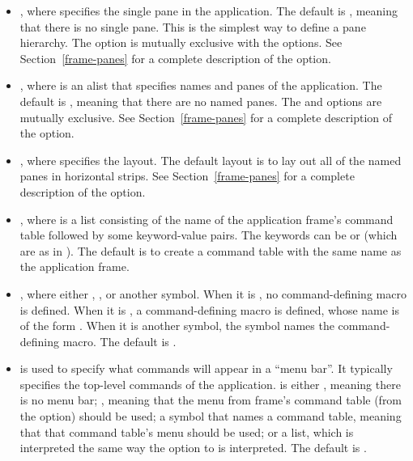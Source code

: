 \begin{itemize}
\item {} , where  specifies the single pane in the
application.  The default is , meaning that there is no single pane.
This is the simplest way to define a pane hierarchy.  The  option is
mutually exclusive with the  options.  See Section~\ref{frame-panes}
for a complete description of the  option.

\item {} , where  is an alist that specifies names
and panes of the application.  The default is , meaning that there are
no named panes.  The  and  options are mutually exclusive.
See Section~\ref{frame-panes} for a complete description of the 
option.

\item {} , where  specifies the layout.  The
default layout is to lay out all of the named panes in horizontal strips.  See
Section~\ref{frame-panes} for a complete description of the 
option.

\item {} , where 
is a list consisting of the name of the application frame's command table
followed by some keyword-value pairs.  The keywords can be  or
 (which are as in ).  The default is to
create a command table with the same name as the application frame.

\item {} , where  either ,
, or another symbol.  When it is , no command-defining macro is
defined.  When it is , a command-defining macro is defined, whose name is
of the form .  When it is another symbol, the
symbol names the command-defining macro.  The default is .

\item {}  is used to specify what commands will appear
in a ``menu bar''.  It typically specifies the top-level commands of the
application.   is either , meaning there is no menu bar;
, meaning that the menu from frame's command table (from the
 option) should be used; a symbol that names a command table,
meaning that that command table's menu should be used; or a list, which is
interpreted the same way the  option to  is
interpreted.  The default is .


\end{itemize}
